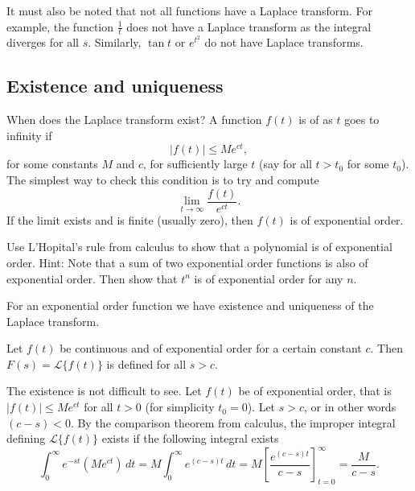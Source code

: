 It must also be noted that not all functions have a Laplace transform.  For
example, the function $\frac{1}{t}$ does not have a Laplace transform as the
integral diverges for all $s$.  Similarly,
$\tan t$ or $e^{t^2}$ do not have Laplace transforms.

\subsection{Existence and uniqueness}

When does the Laplace transform exist?  A function $f(t)$ is of
\emph{} as $t$ goes to infinity if
\begin{equation*}
\lvert f(t) \rvert \leq M e^{ct} ,
\end{equation*}
for some constants $M$ and $c$, for
sufficiently large $t$ (say for all $t > t_0$ for some $t_0$).  The simplest
way to check this condition is to try and compute
\begin{equation*}
\lim_{t\to \infty} \frac{f(t)}{e^{ct}} .
\end{equation*}
If the limit exists and is finite (usually zero), then $f(t)$ is of
exponential order.

\begin{exercise}
Use L'Hopital's rule from calculus to show that a polynomial is of
exponential order.  Hint: Note that a sum of two exponential order functions
is also of exponential order.  Then show that $t^n$ is of exponential order
for any $n$.
\end{exercise}

For an exponential order function we have existence and uniqueness of the
Laplace transform.

\begin{theorem}[Existence]
Let $f(t)$ be continuous and of exponential order for a certain
constant $c$.  Then $F(s) = \mathcal{L} \bigl\{ f(t) \bigr\}$ is defined for
all $s > c$.
\end{theorem}

The existence is not difficult to see.  Let $f(t)$ be of exponential order,
that is $\lvert f(t) \rvert \leq M e^{ct}$ for all $t > 0$ (for simplicity $t_0 = 0$).
Let $s > c$, or in other words $(c-s) < 0$.
By the comparison theorem from calculus, the improper integral defining
$\mathcal{L} \bigl\{ f(t) \bigr\}$ exists if the following integral exists
\begin{equation*}
\int_0^\infty e^{-st} ( M e^{ct} ) \,dt
=
M \int_0^\infty e^{(c-s)t} \,dt = M \left[ \frac{e^{(c-s)t}}{c-s}
\right]_{t=0}^\infty = \frac{M}{c-s} .
\end{equation*}

